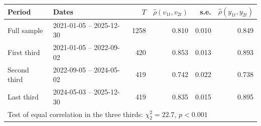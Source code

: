 \begin{tabular}{llrrrr}
\toprule
Period & Dates & $T$ & $\hat\rho(v_{1t}, v_{2t})$ & s.e. & $\hat\rho(y_{1t}, y_{2t})$ \\
\midrule
Full sample & 2021-01-05 -- 2025-12-30 & 1258 & 0.810 & 0.010 & 0.849 \\
First third & 2021-01-05 -- 2022-09-02 & 420 & 0.853 & 0.013 & 0.893 \\
Second third & 2022-09-05 -- 2024-05-02 & 419 & 0.742 & 0.022 & 0.738 \\
Last third & 2024-05-03 -- 2025-12-30 & 419 & 0.835 & 0.015 & 0.895 \\
\midrule
\multicolumn{6}{l}{Test of equal correlation in the three thirds: $\chi^2_2 = 22.7$, $p<0.001$} \\
\bottomrule
\end{tabular}